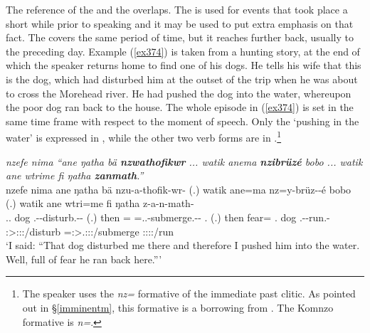 The  reference of the  and the  overlaps. The  is used for events that took place a short while prior to speaking and it may be used to put extra emphasis on that fact. The  covers the same period of time, but it reaches further back, usually to the preceding day. Example (\ref{ex374}) is taken from a hunting story, at the end of which the speaker returns home to find one of his dogs. He tells his wife that this is the dog, which had disturbed him at the outset of the trip when he was about to cross the Morehead river. He had pushed the dog into the water, whereupon the poor dog ran back to the house. The whole episode in (\ref{ex374}) is set in the same time frame with respect to the moment of speech. Only the `pushing in the water' is expressed in , while the other two verb forms are in .\footnote{The speaker uses the \emph{nz=} formative of the immediate past clitic. As pointed out in \S{}\ref{imminentm}, this formative is a borrowing from . The Komnzo formative is \emph{n=}.}

\begin{exe}
	\ex \emph{nzefe nima ``ane ŋatha bä \textbf{nzwathofikwr} ... watik anema \textbf{nzibrüzé} bobo ... watik ane wtrime fi ŋatha \textbf{zanmath}.''}\\
	\glll nzefe nima ane ŋatha bä nzu-a-thofik-wr-\Zero{} (.) watik ane=ma nz=y-brüz-\Zero{}-é bobo (.) watik ane wtri=me fi ŋatha z-a-n-math-\Zero\\
	\Fsg.\Erg.\Emph{} \Quot{} \Dem{} dog \Med{} \Fsg.\Betaone-\Vc-disturb.\Ext-\Ndu-\Stsg{} (.) then \Dem=\Char{} \Immpst=\Tsg.\Masc.\Alph-submerge.\Ext-\Ndu-\Fsg{} \Med.\All{} (.) then \Dem{} fear=\Ins{} \Third.\Abs{} dog \M.\Gam-\Venit-run.\Rs{}-\Stsg\\
	{} {} {} {} {} \footnotesize{\Stsg:\Sbj>\Fsg:\Obj:\Rpst:\Ipfv/disturb} {} {} {} \footnotesize{\Immpst=\Fsg:\Sbj>\Stsg.\Masc:\Obj:\Nonpast:\Ipfv/submerge} {} {} {} {} {} {} {} \footnotesize{\Stsg:\Sbj:\Rpst:\Pfv:\Venit/run}\\
	\trans `I said: ``That dog disturbed me there and therefore I pushed him into the water. Well, full of fear he ran back here.''' 
	\label{ex374}
\end{exe}


